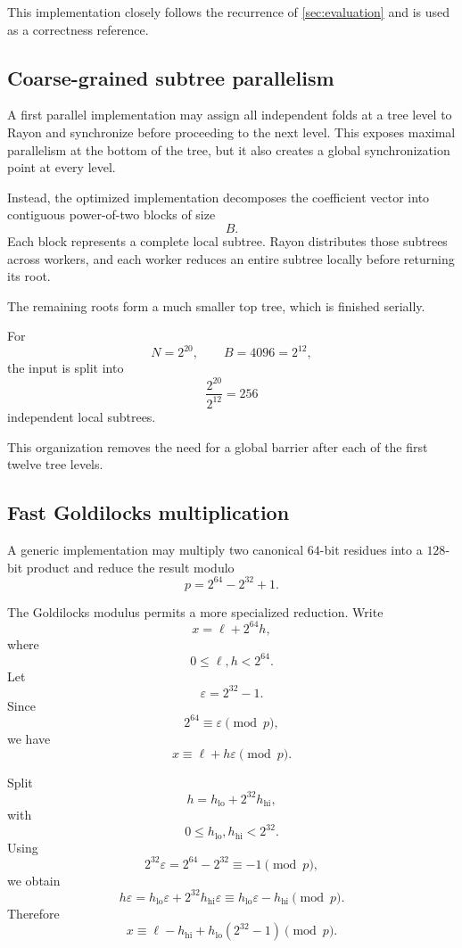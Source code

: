This implementation closely follows the recurrence of
\cref{sec:evaluation} and is used as a correctness reference.

\subsection{Coarse-grained subtree parallelism}

A first parallel implementation may assign all independent folds at a tree
level to Rayon and synchronize before proceeding to the next level.  This
exposes maximal parallelism at the bottom of the tree, but it also creates a
global synchronization point at every level.

Instead, the optimized implementation decomposes the coefficient vector
into contiguous power-of-two blocks of size
\[
B.
\]
Each block represents a complete local subtree.  Rayon distributes those
subtrees across workers, and each worker reduces an entire subtree locally
before returning its root.

The remaining roots form a much smaller top tree, which is finished
serially.

For
\[
N=2^{20},
\qquad
B=4096=2^{12},
\]
the input is split into
\[
\frac{2^{20}}{2^{12}}=256
\]
independent local subtrees.

This organization removes the need for a global barrier after each of the
first twelve tree levels.

\subsection{Fast Goldilocks multiplication}

A generic implementation may multiply two canonical \(64\)-bit residues
into a \(128\)-bit product and reduce the result modulo
\[
p=2^{64}-2^{32}+1.
\]

The Goldilocks modulus permits a more specialized reduction.  Write
\[
x= \ell + 2^{64}h,
\]
where
\[
0\le \ell,h<2^{64}.
\]
Let
\[
\varepsilon = 2^{32}-1.
\]
Since
\[
2^{64}\equiv \varepsilon \pmod p,
\]
we have
\[
x\equiv \ell+h\varepsilon\pmod p.
\]

Split
\[
h=h_{\mathrm{lo}}+2^{32}h_{\mathrm{hi}},
\]
with
\[
0\le h_{\mathrm{lo}},h_{\mathrm{hi}}<2^{32}.
\]
Using
\[
2^{32}\varepsilon
=
2^{64}-2^{32}
\equiv -1
\pmod p,
\]
we obtain
\[
h\varepsilon
=
h_{\mathrm{lo}}\varepsilon
+
2^{32}h_{\mathrm{hi}}\varepsilon
\equiv
h_{\mathrm{lo}}\varepsilon-h_{\mathrm{hi}}
\pmod p.
\]
Therefore
\[
\boxed{
x
\equiv
\ell-h_{\mathrm{hi}}
+
h_{\mathrm{lo}}(2^{32}-1)
\pmod p.
}
\]

